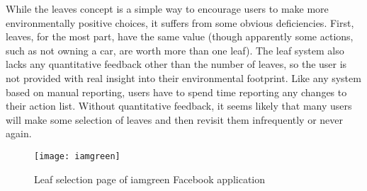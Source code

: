 While the leaves concept is a simple way to encourage users to make more environmentally positive choices, it suffers from some obvious deficiencies. First, leaves, for the most part, have the same value (though apparently some actions, such as not owning a car, are worth more than one leaf). The leaf system also lacks any quantitative feedback other than the number of leaves, so the user is not provided with real insight into their environmental footprint. Like any system based on manual reporting, users have to spend time reporting any changes to their action list. Without quantitative feedback, it seems likely that many users will make some selection of leaves and then revisit them infrequently or never again.

\begin{figure}[htbp]
	\centering
		\texttt{[image: iamgreen]}
		\caption{Leaf selection page of iamgreen Facebook application}
		\label{fig:iamgreen}
\end{figure}


